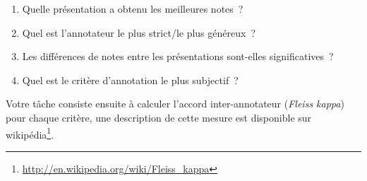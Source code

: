 \documentclass[12pt,a4paper]{article}
\begin{document}
\begin{enumerate}
    \item Quelle présentation a obtenu les meilleures notes~?
    \item Quel est l'annotateur le plus strict/le plus généreux~?
    \item Les différences de notes entre les présentations sont-elles significatives~?
    \item Quel est le critère d'annotation le plus subjectif~?
\end{enumerate}


Votre tâche consiste ensuite à calculer l'accord inter-annotateur (\textit{Fleiss kappa}) pour chaque critère, une description de cette mesure est disponible sur wikipédia\footnote{\url{http://en.wikipedia.org/wiki/Fleiss_kappa}}.
\end{document}

